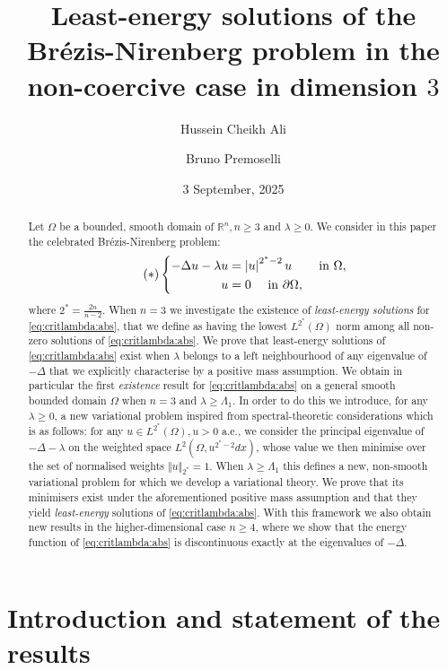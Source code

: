 \documentclass[10pt]{amsart}
\title[]{Least-energy solutions of the Br\'ezis-Nirenberg problem in the non-coercive case in dimension $3$}
\author{Hussein Cheikh Ali}
\author{Bruno Premoselli}
\date{3 September, 2025}
\numberwithin{equation}{section}
\newcommand{\R}{\mathbb{R}}
\newcommand{\Om}{\Omega}
\def \crit{2^{*}}
\theoremstyle{plain}
\theoremstyle{remark}
\begin{document}
\maketitle


	\begin{abstract}
Let $\Om$ be a bounded, smooth domain of $\R^n, n \ge 3$ and $\lambda \ge 0$. We consider in this paper the celebrated Br\'ezis-Nirenberg problem:
\begin{equation}\label{eq:critlambda:abs} \tag{$*$}
	\left\{\begin{aligned}
		-\Delta u -\lambda u & =\left|u\right|^{\crit-2}u &\hbox{ in } \Omega, \\
		u & = 0 \quad \text{ in } \partial \Om, 
			\end{aligned}\right.
\end{equation}
where $2^* = \frac{2n}{n-2}$. When $n=3$ we investigate the existence of \emph{least-energy solutions} for \eqref{eq:critlambda:abs}, that we define as having the lowest $L^{2^*}(\Om)$ norm among all non-zero solutions of \eqref{eq:critlambda:abs}. We prove that least-energy solutions of \eqref{eq:critlambda:abs} exist when $\lambda$ belongs to a left neighbourhood of any eigenvalue of $-\Delta$ that we explicitly characterise by a positive mass assumption. We obtain in particular the first \emph{existence} result for \eqref{eq:critlambda:abs} on a general smooth bounded domain $\Om$ when $n=3$ and $\lambda \ge \Lambda_1$. In order to do this we introduce, for any $\lambda \ge  0$, a new variational problem inspired from spectral-theoretic considerations which is as follows: for any $u \in L^{2^*}(\Om), u>0$ a.e., we consider the principal eigenvalue of $- \Delta-\lambda$ on the weighted  space $L^2(\Om, u^{2^*-2} dx)$, whose value we then minimise over the set of normalised weights $\Vert u \Vert_{2^*} = 1$. When $\lambda \ge \Lambda_1$ this defines a new, non-smooth variational problem for which we develop a variational theory. We prove that its minimisers exist under the aforementioned positive mass assumption and that they yield \emph{least-energy} solutions of \eqref{eq:critlambda:abs}. With this framework we also obtain new results in the higher-dimensional case $n \ge 4$, where we show that the energy function of \eqref{eq:critlambda:abs} is discontinuous exactly at the eigenvalues of $- \Delta$.
\end{abstract}

\tableofcontents


\section{Introduction and statement of the results}
\end{document}
